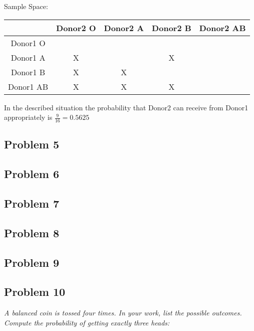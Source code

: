 \documentclass[a4paper,man,natbib]{apa6}
\begin{document}
Sample Space: \\
\begin{tabular}{|c|c|c|c|c|}
	\hline
	& Donor2 O & Donor2 A & Donor2 B & Donor2 AB \\
	\hline Donor1 O   & \checkmark &  \checkmark & \checkmark  & \checkmark \\
	\hline Donor1 A   & X & \checkmark  & X & \checkmark \\
	\hline Donor1 B   & X & X & \checkmark  & \checkmark  \\
	\hline Donor1 AB & X  & X & X &  \checkmark  \\
	\hline
\end{tabular}

	In the described situation the probability that Donor2 can receive from Donor1 appropriately is
	$\frac{9}{16} = 0.5625$

\subsection{Problem 5}
\emph{}

\subsection{Problem 6}
\emph{}

\subsection{Problem 7}
\emph{}

\subsection{Problem 8}
\emph{}

\subsection{Problem 9}
\emph{}

\subsection{Problem 10}
\emph{A balanced coin is tossed four times. In your work, list the possible outcomes. Compute the probability of getting exactly three heads:} \vspace{1em}
\end{document}
